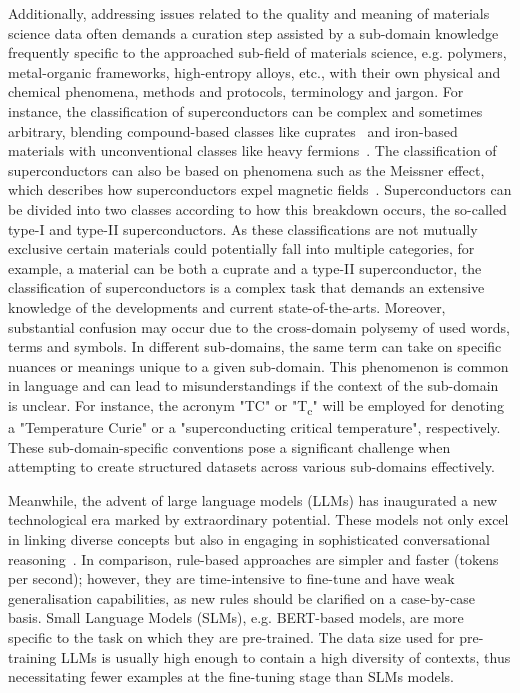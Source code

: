 Additionally, addressing issues related to the quality and meaning of materials science data often demands a curation step assisted by a sub-domain knowledge frequently specific to the approached sub-field of materials science, e.g. polymers, metal-organic frameworks, high-entropy alloys, etc., with their own physical and chemical phenomena, methods and protocols, terminology and jargon. For instance, the classification of superconductors can be complex and sometimes arbitrary, blending compound-based classes like cuprates~\cite{parinov2013microstructure} and iron-based~\cite{hosono2015exploration} materials with unconventional classes like heavy fermions~\cite{mydeen2020electron}. The classification of superconductors can also be based on phenomena such as the Meissner effect, which describes how superconductors expel magnetic fields~\cite{bardeen1957theory}. Superconductors can be divided into two classes according to how this breakdown occurs, the so-called type-I and type-II superconductors. As these classifications are not mutually exclusive certain materials could potentially fall into multiple categories, for example, a material can be both a cuprate and a type-II superconductor, the classification of superconductors is a complex task that demands an extensive knowledge of the developments and current state-of-the-arts.
Moreover, substantial confusion may occur due to the cross-domain polysemy of used words, terms and symbols. In different sub-domains, the same term can take on specific nuances or meanings unique to a given sub-domain. This phenomenon is common in language and can lead to misunderstandings if the context of the sub-domain is unclear. For instance, the acronym "TC" or "T\textsubscript{c}" will be employed for denoting a "Temperature Curie" or a "superconducting critical temperature", respectively. These sub-domain-specific conventions pose a significant challenge when attempting to create structured datasets across various sub-domains effectively.

Meanwhile, the advent of large language models (LLMs) has inaugurated a new technological era marked by extraordinary potential. These models not only excel in linking diverse concepts but also in engaging in sophisticated conversational reasoning~\cite{zhang2023one,yao2023tree,valmeekam2023planning,sun2023pearl}. 
In comparison, rule-based approaches are simpler and faster (tokens per second); however, they are time-intensive to fine-tune and have weak generalisation capabilities, as new rules should be clarified on a case-by-case basis. 
Small Language Models (SLMs), e.g. BERT-based models, are more specific to the task on which they are pre-trained. The data size used for pre-training LLMs is usually high enough to contain a high diversity of contexts, thus necessitating fewer examples at the fine-tuning stage than SLMs models.  

